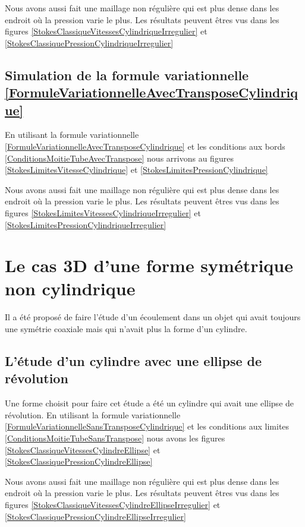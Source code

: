 \documentclass[11pt,a4paper]{article}
\numberwithin{equation}{subsection}
\numberwithin{figure}{subsection}
\begin{document}
Nous avons aussi fait une maillage non régulière qui est plus dense dans les endroit où la pression varie le plus. Les résultats peuvent êtres vus dans les figures \ref{StokesClassiqueVitessesCylindriqueIrregulier} et \ref{StokesClassiquePressionCylindriqueIrregulier}



\subsection{Simulation de la formule variationnelle \ref{FormuleVariationnelleAvecTransposeCylindrique}}

En utilisant la formule variationnelle \ref{FormuleVariationnelleAvecTransposeCylindrique} et les conditions aux bords \ref{ConditionsMoitieTubeAvecTranspose} nous arrivons au figures \ref{StokesLimitesVitesseCylindrique} et \ref{StokesLimitesPressionCylindrique}


Nous avons aussi fait une maillage non régulière qui est plus dense dans les endroit où la pression varie le plus. Les résultats peuvent êtres vus dans les figures \ref{StokesLimitesVitessesCylindriqueIrregulier} et \ref{StokesLimitesPressionCylindriqueIrregulier}


%
%
\section{Le cas 3D d'une forme symétrique non cylindrique}

Il a été proposé de faire l'étude d'un écoulement dans un objet qui avait toujours une symétrie coaxiale mais qui n'avait plus la forme d'un cylindre. 

\subsection{L'étude d'un cylindre avec une ellipse de révolution}

Une forme choisit pour faire cet étude a été un cylindre qui avait une ellipse de révolution. En utilisant la formule variationnelle \ref{FormuleVariationnelleSansTransposeCylindrique} et les conditions aux limites \ref{ConditionsMoitieTubeSansTranspose} nous avons les figures \ref{StokesClassiqueVitessesCylindreEllipse} et \ref{StokesClassiquePressionCylindreEllipse}


Nous avons aussi fait une maillage non régulière qui est plus dense dans les endroit où la pression varie le plus. Les résultats peuvent êtres vus dans les figures \ref{StokesClassiqueVitessesCylindreEllipseIrregulier} et \ref{StokesClassiquePressionCylindreEllipseIrregulier}

\clearpage
\end{document}
